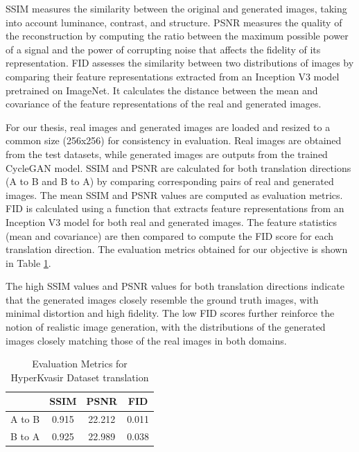 \documentclass[UKenglish,12pt]{master-style}
\begin{document}
SSIM measures the similarity between the original and generated  images, taking into account luminance, contrast, and structure. PSNR measures the quality of the reconstruction by computing the ratio between the maximum possible power of a signal and the power of corrupting noise that affects the fidelity of its representation. FID assesses the similarity between two distributions of images by comparing their feature representations extracted from an Inception V3 model pretrained on ImageNet. It calculates the distance between the mean and covariance of the feature representations of the real and generated images.

For our thesis, real images and generated images are loaded and resized to a common size (256x256) for consistency in evaluation. Real images are obtained from the test datasets, while generated images are outputs from the trained CycleGAN model. SSIM and PSNR are calculated for both translation directions (A to B and B to A) by comparing corresponding pairs of real and generated images. The mean SSIM and PSNR values are computed as evaluation metrics. FID is calculated using a function that extracts feature representations from an Inception V3 model for both real and generated images. The feature statistics (mean and covariance) are then compared to compute the FID score for each translation direction. The evaluation metrics obtained for our objective is shown in Table \ref{tab:evaluation_metrics}.

The high SSIM values and PSNR values for both translation directions indicate that the generated images closely resemble the ground truth images, with minimal distortion and high fidelity. The low FID scores further reinforce the notion of realistic image generation, with the distributions of the generated images closely matching those of the real images in both domains.

\begin{table}[htbp]
    \centering
    \caption{Evaluation Metrics for HyperKvasir Dataset translation}
    \begin{tabular}{|l|c|c|c|}
        \hline
        & SSIM & PSNR & FID \\
        \hline
        A to B & 0.915 & 22.212 & 0.011 \\
        \hline
        B to A & 0.925 & 22.989 & 0.038 \\
        \hline
    \end{tabular}
    \label{tab:evaluation_metrics}
\end{table}
\end{document}
